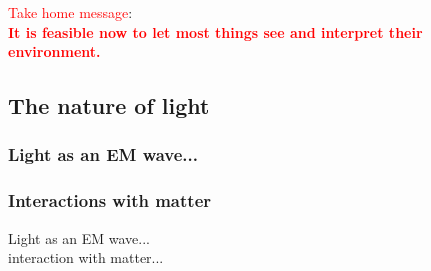 \documentclass[a4paper, fontsize=8pt, landscape, DIV=1]{scrartcl}
\begin{document}
\begin{multicols*}{4}
\begin{minipage}[t]{0.49\columnwidth}
\begin{flushright}
			\end{flushright}
		\end{minipage}			
		\par 
		\textcolor{red}{Take home message}:\\
		\textbf{\textcolor{red}{It is feasible now to let most things see and interpret their environment.}}
		
		\subsection{The nature of light}
		\subsubsection{Light as an EM wave...}
		\subsubsection{Interactions with matter}
		Light as an EM wave...\\
		interaction with matter...\\
		
		
	\end{multicols*}
	\setcounter{secnumdepth}{3}
\end{document}
